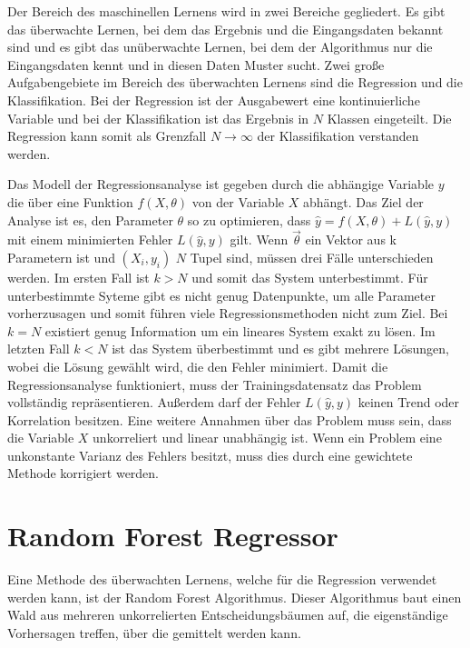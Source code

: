 Der Bereich des maschinellen Lernens wird in zwei Bereiche gegliedert. Es gibt das überwachte Lernen, bei dem das Ergebnis und die Eingangsdaten bekannt
sind und es gibt das unüberwachte Lernen, bei dem der Algorithmus nur die Eingangsdaten kennt und in diesen Daten Muster sucht.
Zwei große Aufgabengebiete im Bereich des überwachten Lernens sind die Regression und die Klassifikation. Bei der Regression ist der Ausgabewert eine
kontinuierliche Variable und bei der Klassifikation ist das Ergebnis in $N$ Klassen eingeteilt. Die Regression kann somit als Grenzfall
$N \to \infty$ der Klassifikation verstanden werden.

Das Modell der Regressionsanalyse ist gegeben durch die abhängige Variable $y$ die über eine Funktion $f(X,\theta)$ von der Variable $X$ abhängt.
Das Ziel der Analyse ist es, den Parameter $\theta$ so zu optimieren, dass $\hat{y} = f(X,\theta) + L(\hat{y},y)$ mit einem minimierten Fehler
$L(\hat{y},y)$ gilt.
Wenn $\vec{\theta}$ ein Vektor aus k Parametern ist und $(X_i,y_i)$ $N$ Tupel sind, müssen drei Fälle unterschieden werden.
Im ersten Fall ist $k>N$ und somit das System unterbestimmt.
Für unterbestimmte Syteme gibt es nicht genug Datenpunkte, um alle Parameter vorherzusagen und somit führen viele Regressionsmethoden
nicht zum Ziel.
Bei $k = N$ existiert genug Information um ein lineares System exakt zu lösen.
Im letzten Fall $k<N$ ist das System überbestimmt und es gibt mehrere Lösungen, wobei die Lösung gewählt wird, die den Fehler minimiert.
Damit die Regressionsanalyse funktioniert, muss der Trainingsdatensatz das Problem vollständig repräsentieren. Außerdem darf der Fehler $L(\hat{y},y)$ keinen Trend
oder Korrelation besitzen.
Eine weitere Annahmen über das Problem muss sein, dass die Variable $X$ unkorreliert und linear unabhängig ist.
Wenn ein Problem eine unkonstante Varianz des Fehlers besitzt, muss dies durch eine gewichtete Methode korrigiert werden.

\section{Random Forest Regressor}

Eine Methode des überwachten Lernens, welche für die Regression verwendet werden kann, ist der Random Forest Algorithmus. Dieser Algorithmus baut
einen Wald aus mehreren unkorrelierten Entscheidungsbäumen auf, die eigenständige Vorhersagen treffen, über die gemittelt werden kann.

